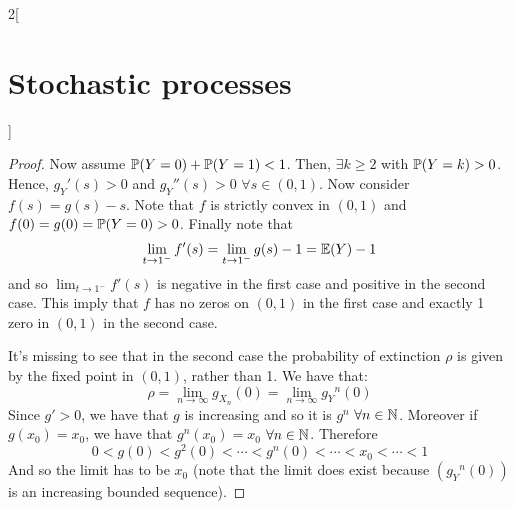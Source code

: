 \documentclass[../../../main_math.tex]{subfiles}
\begin{document}
\begin{multicols}{2}[\section{Stochastic processes}]
\begin{proof}
    Now assume $\mathbb{P}(Y=0)+\mathbb{P}(Y=1)<1$. Then, $\exists k\geq 2$ with $\mathbb{P}(Y=k)>0$. Hence, ${g_Y}'(s)>0$ and ${g_Y}''(s)>0$ $\forall s\in (0,1)$. Now consider $f(s)=g(s)-s$. Note that $f$ is strictly convex in $(0,1)$ and $f(0)=g(0)=\mathbb{P}(Y=0)>0$. Finally note that $$\lim_{t\to 1^-} f'(s)=\lim_{t\to 1^-}g(s)-1=\mathbb{E}(Y)-1$$
    and so $\displaystyle\lim_{t\to 1^-} f'(s)$ is negative in the first case and positive in the second case. This imply that $f$ has no zeros on $(0,1)$ in the first case and exactly 1 zero in $(0,1)$ in the second case.

    It's missing to see that in the second case the probability of extinction $\rho$ is given by the fixed point in $(0,1)$, rather than 1. We have that:
    $$\rho=\lim_{n\to\infty}g_{X_n}(0)=\lim_{n\to\infty}{g_Y}^n(0)$$
    Since $g'>0$, we have that $g$ is increasing and so it is $g^n$ $\forall n\in\mathbb{N}$. Moreover if $g(x_0)=x_0$, we have that $g^n(x_0)=x_0$ $\forall n\in\mathbb{N}$. Therefore $$0<g(0)<g^2(0)<\cdots<g^n(0)<\cdots <x_0<\cdots <1$$
    And so the limit has to be $x_0$ (note that the limit does exist because $({g_Y}^n(0))$ is an increasing bounded sequence).
  \end{proof}

\end{multicols}
\end{document}
